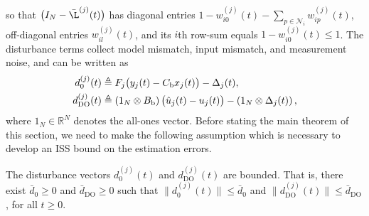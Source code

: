 so that $\big(I_N-\bar{\L}^{(j)}(t)\big)$ has diagonal entries $1-w_{i0}^{(j)}(t)-\sum_{p\in\mathcal{N}_i} w_{ip}^{(j)}(t)$, off-diagonal entries $w_{il}^{(j)}(t)$, and its $i$th row-sum equals $1-w_{i0}^{(j)}(t)\le 1$.
The disturbance terms collect model mismatch, input mismatch, and measurement noise, and can be written as
\begin{align}\label{eq:def_disturbances}
d_0^{(j)}(t) &\triangleq F_j\big(y_j(t)-C_{\text{b}}x_j(t)\big)-\Delta_j(t), \notag\\
d_{\mathrm{DO}}^{(j)}(t) &\triangleq \left(1_N\otimes B_{\text{b}}\right)\big(\hat{u}_j(t)-u_j(t)\big)-\left(1_N\otimes \Delta_j(t)\right),
\end{align}
where $1_N\in\mathbb{R}^N$ denotes the all-ones vector.
Before stating the main theorem of this section, we need to make the following assumption which is necessary to develop an ISS bound on the estimation errors.
\begin{assumption}\label{assum_distur}
The disturbance vectors $d_0^{(j)}(t)$ and $d_{\mathrm{DO}}^{(j)}(t)$ are bounded. That is, there exist $\bar{d}_{0} \geq 0$ and $\bar{d}_{\mathrm{DO}} \geq 0$ such that
$\|d_0^{(j)}(t)\| \le \bar{d}_{0}$ and $\| d_{\mathrm{DO}}^{(j)}(t) \| \le \bar{d}_{\mathrm{DO}}$, for all $t\geq 0$.
\end{assumption}

